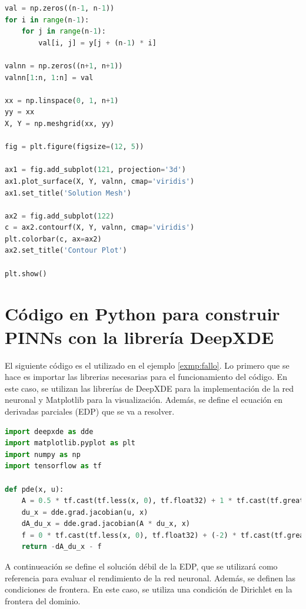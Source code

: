 \documentclass[a4paper,11pt,spanish, twoside, leqno]{tfg-uam}
\theoremstyle{definition}
\begin{document}
\begin{lstlisting}[language=Python] 
val = np.zeros((n-1, n-1))
for i in range(n-1):
    for j in range(n-1):
        val[i, j] = y[j + (n-1) * i]

valnn = np.zeros((n+1, n+1))
valnn[1:n, 1:n] = val

xx = np.linspace(0, 1, n+1)
yy = xx
X, Y = np.meshgrid(xx, yy)

fig = plt.figure(figsize=(12, 5))

ax1 = fig.add_subplot(121, projection='3d')
ax1.plot_surface(X, Y, valnn, cmap='viridis')
ax1.set_title('Solution Mesh')

ax2 = fig.add_subplot(122)
c = ax2.contourf(X, Y, valnn, cmap='viridis')
plt.colorbar(c, ax=ax2)
ax2.set_title('Contour Plot')

plt.show()
\end{lstlisting}


\chapter{Código en Python para construir PINNs con la librería DeepXDE\label{sec:codigo_pinns}}

El siguiente código es el utilizado en el ejemplo \ref{exmp:fallo}. Lo primero que se hace es importar las librerias necesarias para el funcionamiento del código. En este caso, se utilizan las librerías de DeepXDE para la implementación de la red neuronal y Matplotlib para la visualización. Además, se define el ecuación en derivadas parciales (EDP) que se va a resolver. 

\begin{lstlisting}[language=Python]
import deepxde as dde
import matplotlib.pyplot as plt
import numpy as np
import tensorflow as tf 

def pde(x, u):
    A = 0.5 * tf.cast(tf.less(x, 0), tf.float32) + 1 * tf.cast(tf.greater_equal(x, 0), tf.float32) 
    du_x = dde.grad.jacobian(u, x) 
    dA_du_x = dde.grad.jacobian(A * du_x, x) 
    f = 0 * tf.cast(tf.less(x, 0), tf.float32) + (-2) * tf.cast(tf.greater_equal(x, 0), tf.float32) 
    return -dA_du_x - f

\end{lstlisting}

A continueación se define el solución débil de la EDP, que se utilizará como referencia para evaluar el rendimiento de la red neuronal. Además, se definen las condiciones de frontera. En este caso, se utiliza una condición de Dirichlet en la frontera del dominio.
\end{document}
